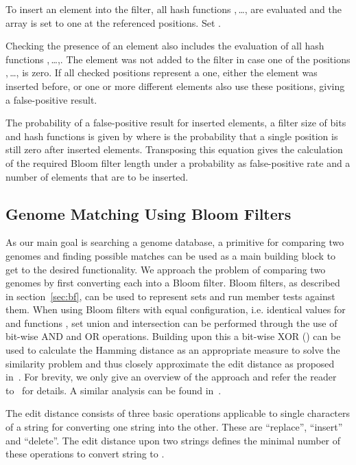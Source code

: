\documentclass{llncs}
\begin{document}
To insert an element  into the filter, all hash functions
,\,\dots, are evaluated and the array  is set to one at the referenced positions.
Set .

Checking the presence of an element  also includes the evaluation of all
hash functions ,\,\dots,.
The element was not added to the filter in case one of the positions
,\,\dots, is zero.
If all checked positions represent a one, either the element was inserted before, or one or more different elements also use these positions, giving a false-positive result.

The probability  of a false-positive result for  inserted elements, a
filter size of  bits and  hash functions is given by 
where  is the probability that a single position is still zero after  inserted elements.
Transposing this equation gives the calculation of the required Bloom filter length  under a probability  as false-positive rate and a number of elements  that are to be inserted.


\subsection{Genome Matching Using Bloom Filters}
\label{sec:matching}

As our main goal is searching a genome database, a primitive for comparing two genomes and finding possible matches can be used as a main building block to get to the desired functionality.
We approach the problem of comparing two genomes by first converting each into a Bloom filter.
Bloom filters, as described in section~\ref{sec:bf}, can be used to represent sets and run member tests against them.
When using Bloom filters with equal configuration, i.e. identical values for  and functions , set union and intersection can be performed through the use of bit-wise AND and OR operations.
Building upon this a bit-wise XOR () can be used to calculate the Hamming distance as an appropriate measure to solve the similarity problem and thus closely approximate the edit distance as proposed in~\cite{BecKer12}.
For brevity, we only give an overview of the approach and refer the reader to~\cite{BecKer12} for details.
A similar analysis can be found in~\cite{DurXue12}.

The edit distance consists of three basic operations applicable to single characters of a string for converting one string into the other.
These are ``replace'', ``insert'' and ``delete''.
The edit distance  upon two strings defines the minimal number of these operations to convert string  to .
\end{document}
